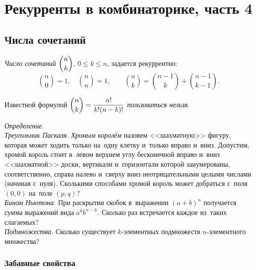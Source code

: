 
\section*{Рекурренты в комбинаторике, часть 4}



\subsection*{Числа сочетаний}

\emph{Число сочетаний} $\dbinom{n}{k}$, $0 \leq k \leq n$,
задается рекуррентно:
\[
    \binom{n}{0} = 1
,\quad
    \binom{n}{n} = 1
,\qquad
    \binom{n}{k} = \binom{n - 1}{k} + \binom{n - 1}{k - 1}
.\]

\observation
Известной формулой $\dbinom{n}{k} = \dfrac{n!}{k! (n - k)!}$
\emph{пользоваться нельзя}.

\begin{problems}

\item\emph{Определение.}
\\
\sbp\emph{Треугольник Паскаля.}
\emph{Хромым королём} назовем <<шахматную>> фигуру, которая может ходить только
на~одну клетку и~только вправо и~вниз.
Допустим, хромой король стоит в~левом верхнем углу бесконечной вправо и~вниз
<<шахматной>> доски, вертикали и~горизонтали которой занумерованы,
соответственно, справа налево и~сверху вниз неотрицательными целыми числами
(начиная с~нуля).
Сколькими способами хромой король может добраться с~поля $(0, 0)$ на~поле
$(p, q)$?
\\
\sbp\emph{Бином Ньютона.}
При раскрытии скобок в~выражении $(a + b)^n$ получается сумма выражений вида
$a^{k} b^{n-k}$.
Сколько раз встречается каждое из~таких слагаемых?
\\
\sbp\emph{Подмножества.}
Сколько существует $k$-эле\-мен\-тных подмножеств $n$-эле\-мен\-тного множества?

\end{problems}

\subsubsection*{Забавные свойства}


